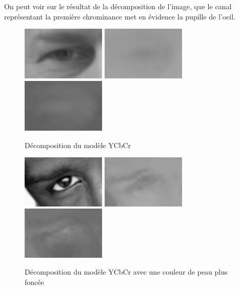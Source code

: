 On peut voir sur le résultat de la décomposition de l'image, que le canal représentant la première chrominance met 
en évidence la pupille de l'oeil.
\begin{figure}[H]
 \center
 \includegraphics[width=4cm]{image/luminance.png}
 \includegraphics[width=4cm]{image/chrominance1.png}
 \includegraphics[width=4cm]{image/chrominance2.png}
 \caption{Décomposition du modèle YCbCr}
\end{figure}

\begin{figure}[H]
 \center
 \includegraphics[width=4cm]{image/luminance_black.png}
 \includegraphics[width=4cm]{image/chrominance1_black.png}
 \includegraphics[width=4cm]{image/chrominance2_black.png}
 \caption{Décomposition du modèle YCbCr avec une couleur de peau plus foncée}
\end{figure}

